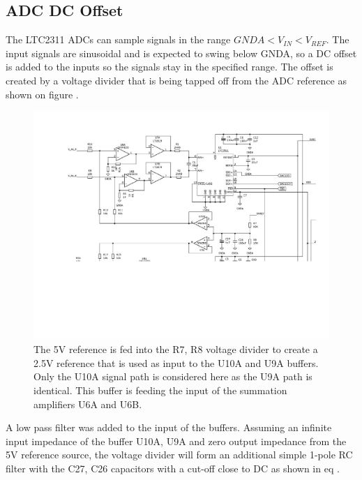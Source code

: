 \subsection{ADC DC Offset} \label{subsec:ADCDCOffset}
The LTC2311 ADCs can sample signals in the range $GNDA < V_{IN} < V_{REF}$. The input signals are sinusoidal and is expected to swing below GNDA, so a  DC offset is added to the inputs so the signals stay in the specified range. The  offset is created by a voltage divider that is being tapped off from the  ADC reference as shown on figure .

\begin{figure}[H]
    \centering
    \includegraphics[clip, trim=0 200 0 0, width=1\textwidth]{Sections/7_SystemDesign/Figures/7_1_3_DCOFFSET.pdf}
    \caption{The 5V reference is fed into the R7, R8 voltage divider to create a 2.5V reference that is used as input to the U10A and U9A buffers. Only the U10A signal path is considered here as the U9A path is identical. This buffer is feeding the input of the summation amplifiers U6A and U6B.}
    \label{fig_7_1_3_ADC2.5VOFFSET}
\end{figure}

A low pass filter was added to the input of the buffers. Assuming an infinite input impedance of the buffer U10A, U9A and zero output impedance from the 5V reference source, the voltage divider will form an additional simple 1-pole RC filter with the C27, C26 capacitors with a cut-off close to DC as shown in eq .

